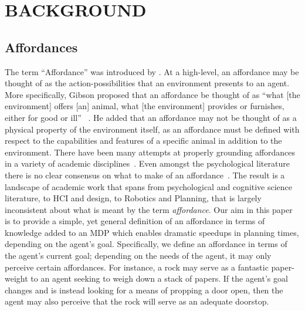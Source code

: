 \documentclass[]{article}
\begin{document}


\section{BACKGROUND}

\subsection{Affordances}

The term ``Affordance'' was introduced by \citet{gibson77}. At a
high-level, an affordance may be thought of as the
action-possibilities that an environment presents to an agent. More
specifically, Gibson proposed that an affordance be thought of as
``what [the environment] offers [an] animal, what [the environment]
provides or furnishes, either for good or ill'' ~\citep{gibson77}. He
added that an affordance may not be thought of as a physical property
of the environment itself, as an affordance must be defined with
respect to the capabilities and features of a specific animal in
addition to the environment.  There have been many attempts at
properly grounding affordances in a variety of academic
disciplines~\citep{koppula13a,harston03,koppula13b,gorniak06,kaschak00}. Even amongst the psychological literature
there is no clear consensus on what to make of an
affordance~\citep{oliver05}.  The result is a landscape of academic
work that spans from psychological and cognitive science literature,
to HCI and design, to Robotics and Planning, that is largely
inconsistent about what is meant by the term {\it affordance}.  Our
aim in this paper is to provide a simple, yet general definition of an
affordance in terms of knowledge added to an MDP which enables
dramatic speedups in planning times, depending on the agent's goal.
Specifically, we define an affordance in terms of the agent's current
goal; depending on the needs of the agent, it may only perceive
certain affordances. For instance, a rock may serve as a fantastic
paper-weight to an agent seeking to weigh down a stack of papers. If
the agent's goal changes and is instead looking for a means of
propping a door open, then the agent may also perceive that the rock
will serve as an adequate doorstop.
\end{document}
